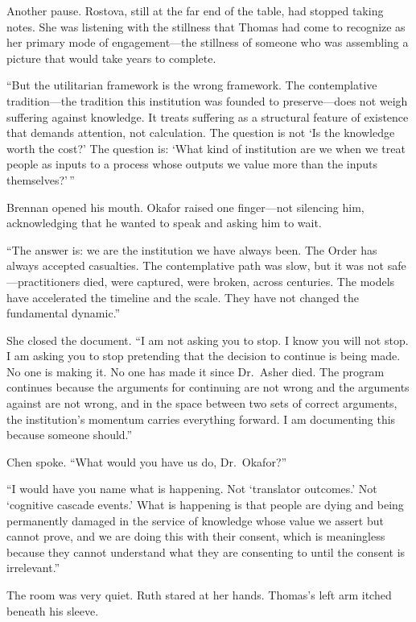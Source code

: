 Another pause. Rostova, still at the far end of the table, had stopped taking notes. She was listening with the stillness that Thomas had come to recognize as her primary mode of engagement---the stillness of someone who was assembling a picture that would take years to complete.

``But the utilitarian framework is the wrong framework. The contemplative tradition---the tradition this institution was founded to preserve---does not weigh suffering against knowledge. It treats suffering as a structural feature of existence that demands attention, not calculation. The question is not `Is the knowledge worth the cost?' The question is: `What kind of institution are we when we treat people as inputs to a process whose outputs we value more than the inputs themselves?'\,''

Brennan opened his mouth. Okafor raised one finger---not silencing him, acknowledging that he wanted to speak and asking him to wait.

``The answer is: we are the institution we have always been. The Order has always accepted casualties. The contemplative path was slow, but it was not safe---practitioners died, were captured, were broken, across centuries. The models have accelerated the timeline and the scale. They have not changed the fundamental dynamic.''

She closed the document. ``I am not asking you to stop. I know you will not stop. I am asking you to stop pretending that the decision to continue is being made. No one is making it. No one has made it since Dr.\ Asher died. The program continues because the arguments for continuing are not wrong and the arguments against are not wrong, and in the space between two sets of correct arguments, the institution's momentum carries everything forward. I am documenting this because someone should.''

Chen spoke. ``What would you have us do, Dr.\ Okafor?''

``I would have you name what is happening. Not `translator outcomes.' Not `cognitive cascade events.' What is happening is that people are dying and being permanently damaged in the service of knowledge whose value we assert but cannot prove, and we are doing this with their consent, which is meaningless because they cannot understand what they are consenting to until the consent is irrelevant.''

The room was very quiet. Ruth stared at her hands. Thomas's left arm itched beneath his sleeve.

